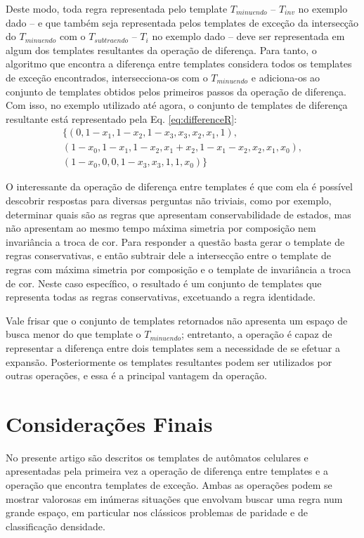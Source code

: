 \documentclass[12pt, a4paper]{article}
\begin{document}
Deste modo, toda regra representada pelo template $T_{minuendo}$ -- $T_{inv}$ no exemplo dado -- e que também seja representada pelos templates de exceção da intersecção do $T_{minuendo}$ com o $T_{subtraendo}$ -- $T_i$ no exemplo dado -- deve ser representada em algum dos templates resultantes da operação de diferença. Para tanto, o algoritmo que encontra a diferença entre templates considera todos os templates de exceção encontrados, intersecciona-os com o $T_{minuendo}$ e adiciona-os ao conjunto de templates obtidos pelos primeiros passos da operação de diferença. Com isso, no exemplo utilizado até agora, o conjunto de templates de diferença resultante está representado pela Eq. \ref{eq:differenceR}:\begin{equation}
\begin{split}
\{(0, 1 - x_1, 1 - x_2, 1 - x_3, x_3, x_2, x_1, 1), \\
(1 - x_0, 1 - x_1, 1 - x_2, x_1 + x_2, 1 - x_1 - x_2, x_2, x_1, x_0), \\
(1 - x_0, 0, 0, 1 - x_3, x_3, 1, 1, x_0)\}
\label{eq:differenceR}
\end{split}
\end{equation}

O interessante da operação de diferença entre templates é que com ela é possível descobrir respostas para diversas perguntas não triviais, como por exemplo, determinar quais são as regras que apresentam conservabilidade de estados, mas não apresentam ao mesmo tempo máxima simetria por composição nem invariância a troca de cor. Para responder a questão basta gerar o template de regras conservativas, e então subtrair dele a intersecção entre o template de regras com máxima simetria por composição e o template de invariância a troca de cor. Neste caso específico, o resultado é um conjunto de templates que representa todas as regras conservativas, excetuando a regra identidade.

Vale frisar que o conjunto de templates retornados não apresenta um espaço de busca menor do que template o $T_{minuendo}$; entretanto, a operação é capaz de representar a diferença entre dois templates sem a necessidade de se efetuar a expansão. Posteriormente os templates resultantes podem ser utilizados por outras operações, e essa é a principal vantagem da operação. 









\section{Considerações Finais}
\label{sec:consideracoes_finais}
No presente artigo são descritos os templates de autômatos celulares e apresentadas pela primeira vez a operação de diferença entre templates e a operação que encontra templates de exceção. Ambas as operações podem se mostrar valorosas em inúmeras situações que envolvam buscar uma regra num grande espaço, em particular nos clássicos problemas de paridade e de classificação densidade.
\end{document}
